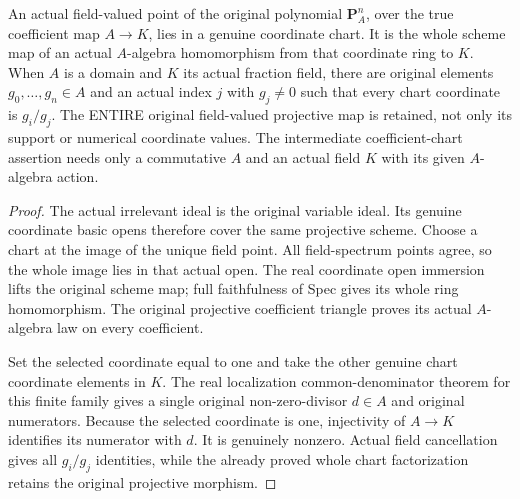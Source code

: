\begin{lemma}
\label{projective:actual-generic-original-coordinates}
An actual field-valued point of the original polynomial $\mathbf P^n_A$, over
the true coefficient map $A\to K$, lies in a genuine coordinate chart. It is the
whole scheme map of an actual $A$-algebra homomorphism from that coordinate ring
to $K$. When $A$ is a domain and $K$ its actual fraction field, there are
original elements $g_0,\ldots,g_n\in A$ and an actual index $j$ with $g_j\ne0$
such that every chart coordinate is $g_i/g_j$. The ENTIRE original field-valued
projective map is retained, not only its support or numerical coordinate values.
The intermediate coefficient-chart assertion needs only a commutative $A$ and
an actual field $K$ with its given $A$-algebra action.
\leanok
\end{lemma}
\begin{proof}
The actual irrelevant ideal is the original variable ideal. Its genuine
coordinate basic opens therefore cover the same projective scheme. Choose a
chart at the image of the unique field point. All field-spectrum points agree,
so the whole image lies in that actual open. The real coordinate open immersion
lifts the original scheme map; full faithfulness of Spec gives its whole ring
homomorphism. The original projective coefficient triangle proves its actual
$A$-algebra law on every coefficient.

Set the selected coordinate equal to one and take the other genuine chart
coordinate elements in $K$. The real localization common-denominator theorem
for this finite family gives a single original non-zero-divisor $d\in A$ and
original numerators. Because the selected coordinate is one, injectivity of
$A\to K$ identifies its numerator with $d$. It is genuinely nonzero. Actual
field cancellation gives all $g_i/g_j$ identities, while the already proved
whole chart factorization retains the original projective morphism.
\end{proof}

